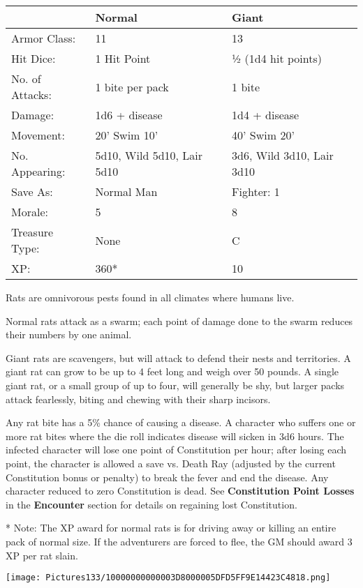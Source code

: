 \documentclass[a4paper,twoside,openany,10pt]{book}
\begin{document}
\begin{multicols}{2}
\begin{tabularx}{0.50\textwidth}{@{}lXX@{}}
& Normal & Giant \\\hline
Armor Class: & 11 & 13 \\\hline
Hit Dice: & 1 Hit Point & ½ (1d4 hit points) \\\hline
No. of Attacks: & 1 bite per pack & 1 bite \\\hline
Damage: & 1d6 + disease & 1d4 + disease \\\hline
Movement: & 20' Swim 10' &
40' Swim 20' \\\hline
No. Appearing: & 5d10, Wild 5d10,  Lair 5d10 & 3d6, Wild 3d10, Lair 3d10 \\\hline
Save As: & Normal Man & Fighter: 1 \\\hline
Morale: & 5 & 8 \\\hline
Treasure Type: & None & C \\\hline
XP: & 360* & 10 \\\hline
\end{tabularx}

Rats are omnivorous pests found in all climates where humans live.

Normal rats attack as a swarm; each point of damage done to the swarm reduces their numbers by one animal.


Giant rats are scavengers, but will attack to defend their nests and territories. A giant rat can grow to be up to 4 feet long and weigh over 50 pounds. A single giant rat, or a small group of up to four, will generally be shy, but larger packs attack fearlessly, biting and chewing with their sharp incisors.

Any rat bite has a 5\% chance of causing a disease. A character who suffers  one or more rat bites where the die roll indicates disease will sicken in 3d6 hours. The infected character will lose one point of Constitution per hour; after losing each point, the character is allowed a save vs. Death Ray (adjusted by the current Constitution bonus or penalty) to break the fever and end the disease. Any character reduced to zero Constitution is dead. See \textbf{Constitution Point Losses} in the \textbf{Encounter} section for details on regaining lost Constitution. 

* Note: The XP award for normal rats is for driving away or killing an entire pack of normal size. If the adventurers are forced to flee, the
GM should award 3 XP per rat slain.

\begin{center}
	\texttt{[image: Pictures133/10000000000003D8000005DFD5FF9E14423C4818.png]}
\end{center}



\end{multicols}
\end{document}
